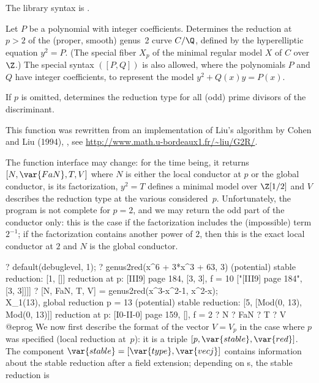 The library syntax is .

\label{se:genus2red}
Let $P$ be a polynomial with integer coefficients.
Determines the reduction at $p > 2$ of the (proper, smooth) genus~2
curve $C/\Q$, defined by the hyperelliptic equation $y^2 = P$. (The
special fiber $X_p$ of the minimal regular model $X$ of $C$ over $\Z$.)
The special syntax $([P,Q])$ is also allowed, where the
polynomials $P$ and $Q$ have integer coefficients, to represent the model
$y^2 + Q(x)y = P(x)$.

If $p$ is omitted, determines the reduction type for all (odd) prime
divisors of the discriminant.

\noindent This function was rewritten from an implementation of Liu's
algorithm by Cohen and Liu (1994), , see
\url{http://www.math.u-bordeaux1.fr/~liu/G2R/}.

 The function interface may change: for the
time being, it returns $[N,\var{FaN}, T, V]$
where $N$ is either the local conductor at $p$ or the
global conductor,  is its factorization, $y^2 = T$ defines a
minimal model over $\Z[1/2]$ and $V$ describes the reduction type at the
various considered~$p$. Unfortunately, the program is not complete for
$p = 2$, and we may return the odd part of the conductor only: this is the
case if the factorization includes the (impossible) term $2^{-1}$; if the
factorization contains another power of $2$, then this is the exact local
conductor at $2$ and $N$ is the global conductor.

\bprog
? default(debuglevel, 1);
? genus2red(x^6 + 3*x^3 + 63, 3)
(potential) stable reduction: [1, []]
reduction at p: [III{9}] page 184, [3, 3], f = 10
       ["[III{9}] page 184", [3, 3]]]]
? [N, FaN, T, V] = genus2red(x^3-x^2-1, x^2-x);  \\ X_1(13), global reduction
p = 13
(potential) stable reduction: [5, [Mod(0, 13), Mod(0, 13)]]
reduction at p: [I{0}-II-0] page 159, [], f = 2
? N
? FaN
? T
? V
@eprog\noindent
We now first describe the format of the vector $V = V_p$ in the case where
$p$ was specified (local reduction at~$p$): it is a triple $[p, \var{stable},
\var{red}]$. The component $\var{stable} = [\var{type}, \var{vecj}]$ contains
information about the stable reduction after a field extension;
depending on s, the stable reduction is

